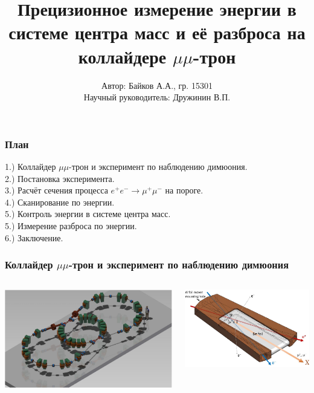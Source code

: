 \documentclass[10pt, pdf, hyperref={unicode}]{beamer}
\title{Прецизионное измерение энергии в системе центра масс и её разброса на коллайдере $\mu\mu$-трон}
\author{Автор: Байков А.А., гр. 15301 \\
	Научный руководитель: Дружинин В.П.}
\begin{document}
\maketitle

\begin{frame}
	\frametitle{План}
	1.) Коллайдер $\mu\mu$-трон и эксперимент по наблюдению димюония.\\
	2.) Постановка эксперимента.\\
	3.) Расчёт сечения процесса $e^+e^- \rightarrow \mu^+\mu^-$ на пороге.\\
	4.) Сканирование по энергии. \\
	5.) Контроль энергии в системе центра масс.\\
	5.) Измерение разброса по энергии.\\
	6.) Заключение.\\
\end{frame}

\begin{frame}
	\frametitle{Коллайдер $\mu\mu$-трон и эксперимент по наблюдению димюония}
	\begin{minipage}{\linewidth}
		\begin{columns}[T]
			\begin{column}{0.5\linewidth}
				\includegraphics[width = 0.95\linewidth]{mumutron.png}
			\end{column}

			\begin{column}{0.5\linewidth}
				\includegraphics[width = 0.95\linewidth]{intreg.png}
			\end{column}
		\end{columns}
	\end{minipage}
\end{frame}
\end{document}
